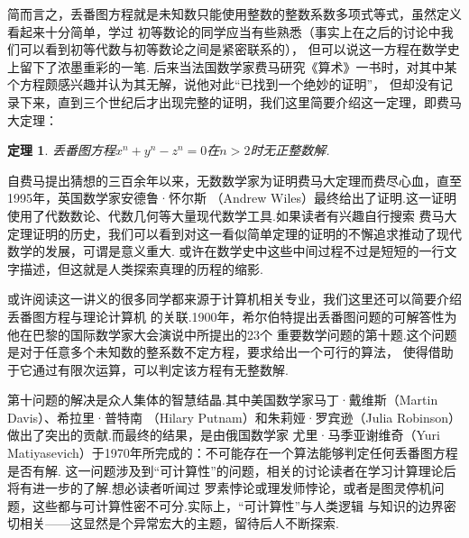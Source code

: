 \documentclass{ctexbook}
\newtheorem{theorem}{定理}[chapter]
\begin{document}
简而言之，丢番图方程就是未知数只能使用整数的整数系数多项式等式，虽然定义看起来十分简单，学过
初等数论的同学应当有些熟悉（事实上在之后的讨论中我们可以看到初等代数与初等数论之间是紧密联系的），
但可以说这一方程在数学史上留下了浓墨重彩的一笔.
后来当法国数学家费马研究《算术》一书时，对其中某个方程颇感兴趣并认为其无解，说他对此“已找到一个绝妙的证明”，
但却没有记录下来，直到三个世纪后才出现完整的证明，我们这里简要介绍这一定理，即费马大定理：
\begin{theorem}
    丢番图方程$x^n+y^n-z^n=0$在$n>2$时无正整数解.
\end{theorem}

自费马提出猜想的三百余年以来，无数数学家为证明费马大定理而费尽心血，直至1995年，英国数学家安德鲁·怀尔斯
（Andrew Wiles）最终给出了证明.这一证明使用了代数数论、代数几何等大量现代数学工具.如果读者有兴趣自行搜索
费马大定理证明的历史，我们可以看到对这一看似简单定理的证明的不懈追求推动了现代数学的发展，可谓是意义重大.
或许在数学史中这些中间过程不过是短短的一行文字描述，但这就是人类探索真理的历程的缩影.

或许阅读这一讲义的很多同学都来源于计算机相关专业，我们这里还可以简要介绍丢番图方程与理论计算机
的关联.1900年，希尔伯特提出丢番图问题的可解答性为他在巴黎的国际数学家大会演说中所提出的23个
重要数学问题的第十题.这个问题是对于任意多个未知数的整系数不定方程，要求给出一个可行的算法，
使得借助于它通过有限次运算，可以判定该方程有无整数解.

第十问题的解决是众人集体的智慧结晶.其中美国数学家马丁·戴维斯（Martin Davis）、希拉里·普特南
（Hilary Putnam）和朱莉娅·罗宾逊（Julia Robinson）做出了突出的贡献.而最终的结果，是由俄国数学家
尤里·马季亚谢维奇（Yuri Matiyasevich）于1970年所完成的：不可能存在一个算法能够判定任何丢番图方程是否有解.
这一问题涉及到``可计算性''的问题，相关的讨论读者在学习计算理论后将有进一步的了解.想必读者听闻过
罗素悖论或理发师悖论，或者是图灵停机问题，这些都与可计算性密不可分.实际上，``可计算性''与人类逻辑
与知识的边界密切相关——这显然是个异常宏大的主题，留待后人不断探索.
\end{document}
